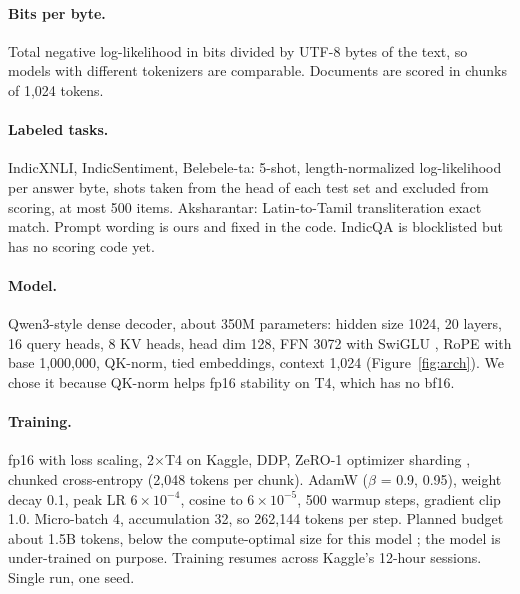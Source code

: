\documentclass[11pt]{article}
\begin{document}
\paragraph{Bits per byte.}
Total negative log-likelihood in bits divided by UTF-8 bytes of the text, so models with different tokenizers are comparable. Documents are scored in chunks of 1,024 tokens.

\paragraph{Labeled tasks.}
IndicXNLI, IndicSentiment, Belebele-ta: 5-shot, length-normalized log-likelihood per answer byte, shots taken from the head of each test set and excluded from scoring, at most 500 items.
Aksharantar: Latin-to-Tamil transliteration exact match.
Prompt wording is ours and fixed in the code. IndicQA is blocklisted but has no scoring code yet.

\paragraph{Model.}
Qwen3-style \cite{qwen3} dense decoder, about 350M parameters: hidden size 1024, 20 layers, 16 query heads, 8 KV heads, head dim 128, FFN 3072 with SwiGLU \cite{shazeer2020glu}, RoPE \cite{su2021rope} with base 1,000,000, QK-norm, tied embeddings, context 1,024 (Figure~\ref{fig:arch}).
We chose it because QK-norm helps fp16 stability on T4, which has no bf16.

\paragraph{Training.}
fp16 with loss scaling, 2$\times$T4 on Kaggle, DDP, ZeRO-1 optimizer sharding \cite{rajbhandari2020zero}, chunked cross-entropy (2,048 tokens per chunk).
AdamW ($\beta$ = 0.9, 0.95), weight decay 0.1, peak LR $6\times10^{-4}$, cosine to $6\times10^{-5}$, 500 warmup steps, gradient clip 1.0.
Micro-batch 4, accumulation 32, so 262,144 tokens per step.
Planned budget about 1.5B tokens, below the compute-optimal size for this model \cite{hoffmann2022chinchilla}; the model is under-trained on purpose.
Training resumes across Kaggle's 12-hour sessions. Single run, one seed.
\end{document}
